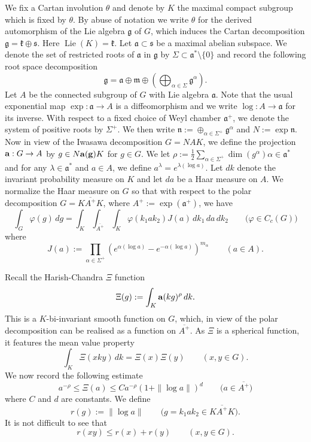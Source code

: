 \documentclass[12pt,letterpaper,titlepage,reqno]{amsart}
\theoremstyle{plain}
\theoremstyle{definition}
\numberwithin{equation}{section}
\newcommand{\Lie}{\operatorname{Lie}}
\def\af{\mathfrak{a}}
\begin{document}
We fix a  Cartan involution $\theta$ and denote by $K$ the maximal compact subgroup which is fixed by $\theta$.  By abuse of notation we write $\theta$ for the derived automorphism of the Lie algebra $\mathfrak{g} $ of $G$, which induces the Cartan decomposition $\mathfrak{g}=\mathfrak{k}\oplus\mathfrak{s}$. Here $\Lie(K)=\mathfrak{k}$. Let $\mathfrak{a}\subset\mathfrak{s}$ be a maximal abelian subspace. We denote the set of restricted roots of $\mathfrak{a}$ in $\mathfrak{g}$ by $\Sigma \subset \mathfrak{a}^{*}\setminus \{0\}$ and record the following root space decomposition
$$
\mathfrak{g}
=\mathfrak{a}\oplus\mathfrak{m}\oplus\left(\bigoplus_{\alpha\in \Sigma}\mathfrak{g}^{\alpha}\right).
$$
Let $A$ be the connected  subgroup of $G$ with Lie algebra $\mathfrak{a}$. Note that the usual exponential map $\exp: \mathfrak{a}\rightarrow A$ is a diffeomorphism and we write $\log :A\rightarrow \mathfrak{a}$ for its inverse. With respect to a fixed choice of Weyl chamber $\af^{+}$, we denote the system of positive roots by $\Sigma^{+}$. We then write $\mathfrak{n}:=\oplus_{\alpha\in \Sigma^+}\mathfrak{g}^{\alpha}$
and $ N :=\exp \mathfrak{n}$. Now in view of the Iwasawa decomposition $G=NAK$, we define the projection ${\bf{a}}:G\rightarrow A$ by $g\in N{\bf{a}(g)}K$ for $g\in G$. We let $\rho:= \frac12 \sum_{\alpha\in \Sigma^+}\dim (g^{\alpha})\alpha \in \mathfrak{a}^{*}$ and for any $\lambda\in \mathfrak{a}^{*}$ and $a\in A$, we define $a^{\lambda}=e^{\lambda(\log a)}$.
Let $dk$ denote the invariant probability measure on $K$ and let $da$ be a Haar measure on $A$. We normalize the Haar measure on $G$ so that with respect to the polar decomposition $G=K\overline{A^+}K$, where $A^+:= \exp(\mathfrak{a}^+)$, we have
\begin{equation}
\label{intpol}
\int_G\varphi(g)\,dg
= \int_{K}\int_{\overline{A^+}}\int_{K}\varphi(k_1ak_2) J(a)\,dk_1\,da\,dk_2
\qquad\big(\varphi\in C_{c}(G)\big)
\end{equation}
where
$$
J(a)
:=\prod_{\alpha\in \Sigma^{+}} \left(e^{\alpha(\log a)}-e^{-\alpha(\log a)}\right)^{m_{\alpha}}\qquad(a\in A).
$$

Recall the Harish-Chandra $\Xi$ function
$$
\Xi(g)
:= \int_{K}{\bf{a}}(kg)^{\rho}\,dk.
$$
This is a $K$-bi-invariant smooth function on $G$, which, in view of the polar decomposition can be realised as a function on $\overline{A^+}$. As $\Xi$ is a spherical function, it features the mean value property
\begin{equation}
	\label{mvtxi}
\int_{K}\Xi(xky)\,dk
=\Xi(x)\Xi(y)\qquad(x,y\in G).
\end{equation}
We now record the following estimate
\begin{equation}
\label{sphest}
a^{-\rho}\leq \Xi(a)\le C a^{-\rho}(1+\| \log a\|)^d\qquad \big(a\in \overline{A^+}\big)
\end{equation}
where $C$ and $d$ are constants.
We define
$$
r(g)
:=\|\log a\|\qquad \big(g=k_1ak_2\in K\overline{A^+}K\big).
$$
It is not difficult to see that
\begin{equation}\label{subadwt}
r(xy)\leq r(x)+r(y)\qquad(x,y\in G).
\end{equation}
\end{document}
